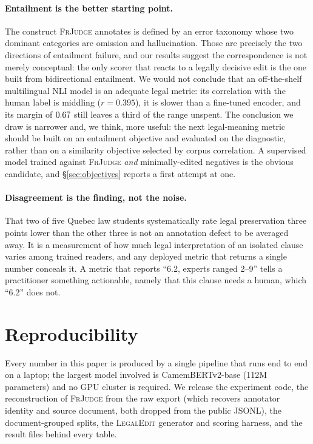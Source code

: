 \documentclass[11pt]{article}
\begin{document}
\paragraph{Entailment is the better starting point.}
The construct \textsc{FrJudge} annotates is defined by an error taxonomy whose
two dominant categories are omission and hallucination. Those are precisely the
two directions of entailment failure, and our results suggest the correspondence
is not merely conceptual: the only scorer that reacts to a legally decisive edit
is the one built from bidirectional entailment. We would not conclude that an
off-the-shelf multilingual NLI model is an adequate legal metric: its
correlation with the human label is middling ($r=0.395$), it is slower than a
fine-tuned encoder, and its margin of $0.67$ still leaves a third of the
range unspent. The conclusion we draw is narrower and, we think, more useful:
the next legal-meaning metric should be built on an entailment objective and
evaluated on the diagnostic, rather than on a similarity objective selected by
corpus correlation. A supervised model trained against \textsc{FrJudge}
\emph{and} minimally-edited negatives is the obvious candidate, and
\S\ref{sec:objectives} reports a first attempt at one.

\paragraph{Disagreement is the finding, not the noise.}
That two of five Quebec law students systematically rate legal preservation
three points lower than the other three is not an annotation defect to be
averaged away. It is a measurement of how much legal interpretation of an
isolated clause varies among trained readers, and any deployed metric that
returns a single number conceals it. A metric that reports ``6.2, experts ranged
2--9'' tells a practitioner something actionable, namely that this clause needs
a human, which ``6.2'' does not.

\section{Reproducibility}
\label{sec:repro}

Every number in this paper is produced by a single pipeline that runs end to end
on a laptop; the largest model involved is CamemBERTv2-base (112M parameters)
and no GPU cluster is required. We release the experiment code, the
reconstruction of \textsc{FrJudge} from the raw export (which recovers annotator
identity and source document, both dropped from the public JSONL), the
document-grouped splits, the \textsc{LegalEdit} generator and scoring harness,
and the result files behind every table.
\end{document}
